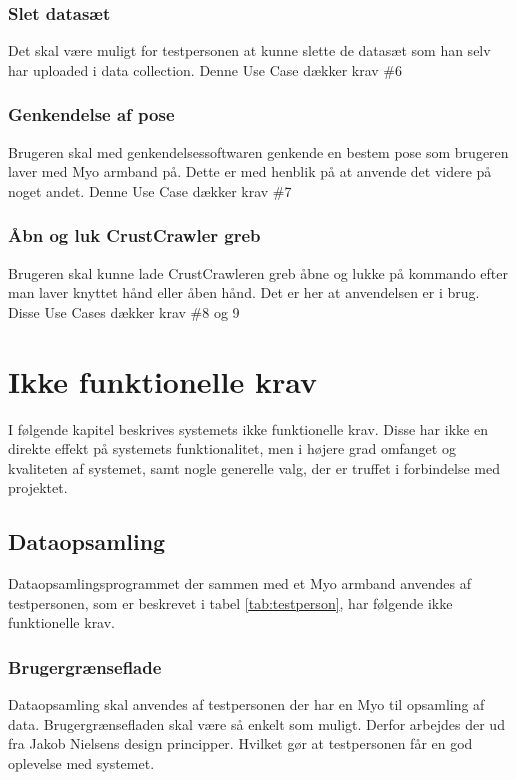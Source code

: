 \subsubsection{Slet datasæt}
Det skal være muligt for testpersonen at kunne slette de datasæt som han selv har uploaded i data collection. Denne Use Case dækker krav \#6
\subsubsection{Genkendelse af pose}
Brugeren skal med genkendelsessoftwaren genkende en bestem pose som brugeren laver med Myo armband på. Dette er med henblik på at anvende det videre på noget andet. Denne Use Case dækker krav \#7
\subsubsection{Åbn og luk CrustCrawler greb}
Brugeren skal kunne lade CrustCrawleren greb åbne og lukke på kommando efter man laver knyttet hånd eller åben hånd. Det er her at anvendelsen er i brug. Disse Use Cases dækker krav \#8 og 9

\section{Ikke funktionelle krav}
\label{sec:ikkefunktionellekrav}
I følgende kapitel beskrives systemets ikke funktionelle krav. Disse har ikke en direkte effekt på systemets funktionalitet, men i højere grad omfanget og kvaliteten af systemet, samt nogle generelle valg, der er truffet i forbindelse med projektet.

\subsection*{Dataopsamling}
Dataopsamlingsprogrammet der sammen med et Myo armband anvendes af testpersonen, som er beskrevet i tabel \ref{tab:testperson}, har følgende ikke funktionelle krav.

\subsubsection{Brugergrænseflade}
Dataopsamling skal anvendes af testpersonen der har en Myo til opsamling af data. Brugergrænsefladen skal være så enkelt som muligt.  Derfor arbejdes der ud fra Jakob Nielsens design principper. Hvilket gør at testpersonen får en god oplevelse med systemet.

